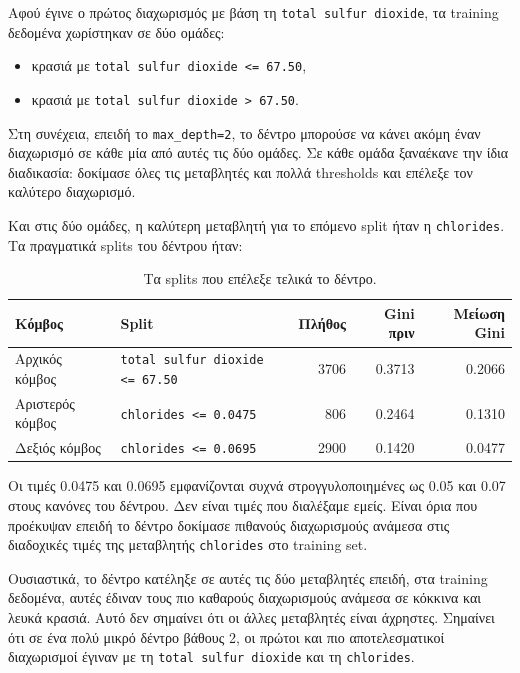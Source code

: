 \documentclass[12pt,a4paper]{article}
\newcommand{\code}[1]{\texttt{\textenglish{#1}}}
\begin{document}
Αφού έγινε ο πρώτος διαχωρισμός με βάση τη \code{total sulfur dioxide}, τα
training δεδομένα χωρίστηκαν σε δύο ομάδες:

\begin{itemize}
    \item κρασιά με \code{total sulfur dioxide <= 67.50},
    \item κρασιά με \code{total sulfur dioxide > 67.50}.
\end{itemize}

Στη συνέχεια, επειδή το \code{max\_depth=2}, το δέντρο μπορούσε να κάνει ακόμη
έναν διαχωρισμό σε κάθε μία από αυτές τις δύο ομάδες. Σε κάθε ομάδα ξαναέκανε
την ίδια διαδικασία: δοκίμασε όλες τις μεταβλητές και πολλά thresholds και
επέλεξε τον καλύτερο διαχωρισμό.

Και στις δύο ομάδες, η καλύτερη μεταβλητή για το επόμενο split ήταν η
\code{chlorides}. Τα πραγματικά splits του δέντρου ήταν:

\begin{table}[H]
\centering
\caption{Τα splits που επέλεξε τελικά το δέντρο.}
\small
\begin{tabular}{p{3.2cm}p{3.3cm}rrr}
\toprule
\textbf{Κόμβος} & \textbf{Split} & \textbf{Πλήθος} & \textbf{Gini πριν} & \textbf{Μείωση Gini} \\
\midrule
Αρχικός κόμβος &
\code{total sulfur dioxide <= 67.50} &
3706 & 0.3713 & 0.2066 \\
\addlinespace
Αριστερός κόμβος &
\code{chlorides <= 0.0475} &
806 & 0.2464 & 0.1310 \\
\addlinespace
Δεξιός κόμβος &
\code{chlorides <= 0.0695} &
2900 & 0.1420 & 0.0477 \\
\bottomrule
\end{tabular}
\end{table}

Οι τιμές 0.0475 και 0.0695 εμφανίζονται συχνά στρογγυλοποιημένες ως 0.05 και
0.07 στους κανόνες του δέντρου. Δεν είναι τιμές που διαλέξαμε εμείς. Είναι
όρια που προέκυψαν επειδή το δέντρο δοκίμασε πιθανούς διαχωρισμούς ανάμεσα
στις διαδοχικές τιμές της μεταβλητής \code{chlorides} στο training set.

Ουσιαστικά, το δέντρο κατέληξε σε αυτές τις δύο μεταβλητές επειδή, στα
training δεδομένα, αυτές έδιναν τους πιο καθαρούς διαχωρισμούς ανάμεσα σε
κόκκινα και λευκά κρασιά. Αυτό δεν σημαίνει ότι οι άλλες μεταβλητές είναι
άχρηστες. Σημαίνει ότι σε ένα πολύ μικρό δέντρο βάθους 2, οι πρώτοι και πιο
αποτελεσματικοί διαχωρισμοί έγιναν με τη \code{total sulfur dioxide} και τη
\code{chlorides}.
\end{document}
